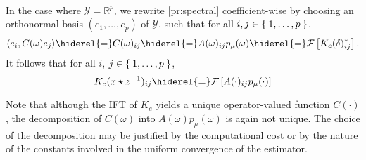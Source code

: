 \paragraph{}
In the case where $\mathcal{Y}=\mathbb{R}^p$, we rewrite \cref{pr:spectral} coefficient-wise by choosing an orthonormal basis $(e_1,\ldots, e_p)$ of $\mathcal{Y}$, such that for all $ i,j\in \Set{1, \ldots, p}$,
\begin{dmath}
\label{eq:operator_identification_real}\inner{e_i,C(\omega)e_j}\hiderel{=}C(\omega)_{ij}\hiderel{=}A(\omega)_{ij}p_{\mu}(\omega)\hiderel{=}\FT{K_e(\delta)^*_{ij}}.
\end{dmath}
It follows that for all $i$, $j \in \Set{1, \ldots, p}$,
\begin{dmath}\label{eq:matrix-exp}
K_e(x\groupop \inv{z})_{ij} \hiderel{=} \FT{A(\cdot)_{ij}p_\mu(\cdot)}
\end{dmath}

\begin{remark}
Note that although the \acl{IFT} of $K_e$ yields a unique operator-valued function $C(\cdot)$, the decomposition of $C(\omega)$ into $A(\omega)p_\mu(\omega)$ is again not unique. The choice of the decomposition may be justified by the computational cost or by the nature of the constants involved in the uniform convergence of the estimator.
\end{remark}

